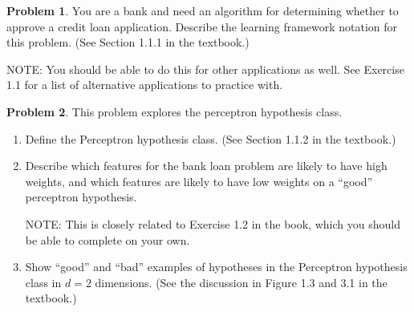 \documentclass[10pt]{article}
\theoremstyle{definition}
\newtheorem{problem}{Problem}
\begin{document}
\begin{problem}
    You are a bank and need an algorithm for determining whether to approve a credit loan application.
    Describe the learning framework notation for this problem.
    (See Section 1.1.1 in the textbook.)

    NOTE: You should be able to do this for other applications as well.
    See Exercise 1.1 for a list of alternative applications to practice with.
\end{problem}

\newpage
\begin{problem}
    This problem explores the perceptron hypothesis class.
    \begin{enumerate}
    \item
    Define the Perceptron hypothesis class.
    (See Section 1.1.2 in the textbook.)
            \vspace{4in}

    \item
    Describe which features for the bank loan problem are likely to have high weights, and which features are likely to have low weights on a ``good'' perceptron hypothesis.

    NOTE:
        This is closely related to Exercise 1.2 in the book, which you should be able to complete on your own.

        \newpage
    \item
    Show ``good'' and ``bad'' examples of hypotheses in the Perceptron hypothesis class in $d=2$ dimensions.
    (See the discussion in Figure 1.3 and 3.1 in the textbook.)


            \vspace{4in}
    \end{enumerate}
\end{problem}

\end{document}
